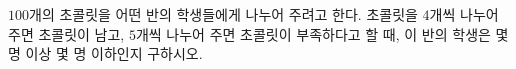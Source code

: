 $100$개의 초콜릿을 어떤 반의 학생들에게 나누어 주려고 한다. 초콜릿을 $4$개씩 나누어 주면 초콜릿이 남고, $5$개씩 나누어 주면 초콜릿이 부족하다고 할 때, 이 반의 학생은 몇 명 이상 몇 명 이하인지 구하시오.
